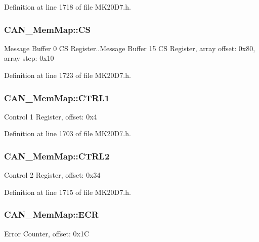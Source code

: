 Definition at line 1718 of file M\+K20\+D7.\+h.

\subsubsection[{\texorpdfstring{CS}{CS}}]{ C\+A\+N\+\_\+\+Mem\+Map\+::\+CS}\hypertarget{struct_c_a_n___mem_map_ac511ae72304784d21dd721b3da9b0e34}{}\label{struct_c_a_n___mem_map_ac511ae72304784d21dd721b3da9b0e34}
Message Buffer 0 CS Register..Message Buffer 15 CS Register, array offset\+: 0x80, array step\+: 0x10 

Definition at line 1723 of file M\+K20\+D7.\+h.

\subsubsection[{\texorpdfstring{C\+T\+R\+L1}{CTRL1}}]{ C\+A\+N\+\_\+\+Mem\+Map\+::\+C\+T\+R\+L1}\hypertarget{struct_c_a_n___mem_map_aa7e5faeb995f97f465296095ec696576}{}\label{struct_c_a_n___mem_map_aa7e5faeb995f97f465296095ec696576}
Control 1 Register, offset\+: 0x4 

Definition at line 1703 of file M\+K20\+D7.\+h.

\subsubsection[{\texorpdfstring{C\+T\+R\+L2}{CTRL2}}]{ C\+A\+N\+\_\+\+Mem\+Map\+::\+C\+T\+R\+L2}\hypertarget{struct_c_a_n___mem_map_a41eb581b62dccef45c7217265649e0ea}{}\label{struct_c_a_n___mem_map_a41eb581b62dccef45c7217265649e0ea}
Control 2 Register, offset\+: 0x34 

Definition at line 1715 of file M\+K20\+D7.\+h.

\subsubsection[{\texorpdfstring{E\+CR}{ECR}}]{ C\+A\+N\+\_\+\+Mem\+Map\+::\+E\+CR}\hypertarget{struct_c_a_n___mem_map_ae333e3fdb5adc42d26fa7a9b9c2014f4}{}\label{struct_c_a_n___mem_map_ae333e3fdb5adc42d26fa7a9b9c2014f4}
Error Counter, offset\+: 0x1C 

